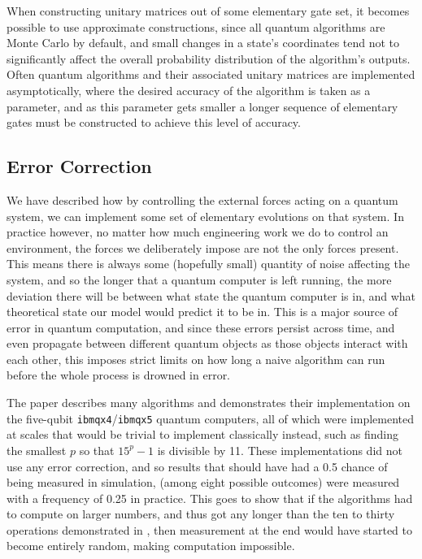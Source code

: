 When constructing unitary matrices out of some elementary gate set, it becomes possible to use approximate constructions, since all quantum algorithms are Monte Carlo by default, and small changes in a state's coordinates tend not to significantly affect the overall probability distribution of the algorithm's outputs. Often quantum algorithms and their associated unitary matrices are implemented asymptotically, where the desired accuracy of the algorithm is taken as a parameter, and as this parameter gets smaller a longer sequence of elementary gates must be constructed to achieve this level of accuracy.

\subsection{Error Correction}\label{error-codes}
We have described how by controlling the external forces acting on a quantum system, we can implement some set of elementary evolutions on that system. In practice however, no matter how much engineering work we do to control an environment, the forces we deliberately impose are not the only forces present. This means there is always some (hopefully small) quantity of noise affecting the system, and so the longer that a quantum computer is left running, the more deviation there will be between what state the quantum computer is in, and what theoretical state our model would predict it to be in. This is a major source of error in quantum computation, and since these errors persist across time, and even propagate between different quantum objects as those objects interact with each other, this imposes strict limits on how long a naive algorithm can run before the whole process is drowned in error.

The paper \cite{algos} describes many algorithms and demonstrates their implementation on the five-qubit \verb`ibmqx4`/\verb`ibmqx5` quantum computers, all of which were implemented at scales that would be trivial to implement classically instead, such as finding the smallest $p$ so that $15^p-1$ is divisible by 11. These implementations did not use any error correction, and so results that should have had a 0.5 chance of being measured in simulation, (among eight possible outcomes) were measured with a frequency of 0.25 in practice. This goes to show that if the algorithms had to compute on larger numbers, and thus got any longer than the ten to thirty operations demonstrated in \cite{algos}, then measurement at the end would have started to become entirely random, making computation impossible.

